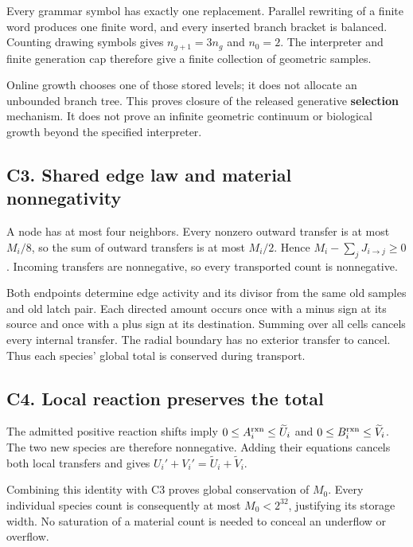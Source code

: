 \documentclass[11pt,a4paper]{article}
\begin{document}
Every grammar symbol has exactly one replacement. Parallel rewriting of
a finite word produces one finite word, and every inserted branch
bracket is balanced. Counting drawing symbols gives \(n_{g+1}=3n_g\) and
\(n_0=2\). The interpreter and finite generation cap therefore give a
finite collection of geometric samples.

Online growth chooses one of those stored levels; it does not allocate
an unbounded branch tree. This proves closure of the released generative
\textbf{selection} mechanism. It does not prove an infinite geometric
continuum or biological growth beyond the specified interpreter.

\subsection{C3. Shared edge law and material
nonnegativity}\label{c3.-shared-edge-law-and-material-nonnegativity}

A node has at most four neighbors. Every nonzero outward transfer is at
most \(M_i/8\), so the sum of outward transfers is at most \(M_i/2\).
Hence \(M_i-\sum_jJ_{i\to j}\ge0\). Incoming transfers are nonnegative,
so every transported count is nonnegative.

Both endpoints determine edge activity and its divisor from the same old
samples and old latch pair. Each directed amount occurs once with a
minus sign at its source and once with a plus sign at its destination.
Summing over all cells cancels every internal transfer. The radial
boundary has no exterior transfer to cancel. Thus each species' global
total is conserved during transport.

\subsection{C4. Local reaction preserves the
total}\label{c4.-local-reaction-preserves-the-total}

The admitted positive reaction shifts imply
\(0\le A_i^{\rm rxn}\le\widetilde U_i\) and
\(0\le B_i^{\rm rxn}\le\widetilde V_i\). The two new species are
therefore nonnegative. Adding their equations cancels both local
transfers and gives \(U_i'+V_i'=\widetilde U_i+\widetilde V_i\).

Combining this identity with C3 proves global conservation of \(M_0\).
Every individual species count is consequently at most \(M_0<2^{32}\),
justifying its storage width. No saturation of a material count is
needed to conceal an underflow or overflow.
\end{document}
